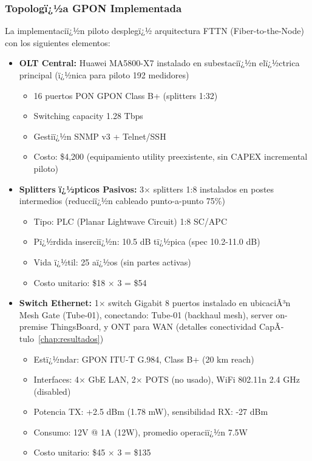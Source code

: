 \subsubsection{Topologï¿½a GPON Implementada}

La implementaciï¿½n piloto desplegï¿½ arquitectura FTTN (Fiber-to-the-Node) con los siguientes elementos:

\begin{itemize}
    \item \textbf{OLT Central:} Huawei MA5800-X7 instalado en subestaciï¿½n elï¿½ctrica principal (ï¿½nica para piloto 192 medidores)
    \begin{itemize}
        \item 16 puertos PON GPON Class B+ (splitters 1:32)
        \item Switching capacity 1.28 Tbps
        \item Gestiï¿½n SNMP v3 + Telnet/SSH
        \item Costo: \$4,200 (equipamiento utility preexistente, sin CAPEX incremental piloto)
    \end{itemize}
    
    \item \textbf{Splitters ï¿½pticos Pasivos:} 3$\times$ splitters 1:8 instalados en postes intermedios (reducciï¿½n cableado punto-a-punto 75\%)
    \begin{itemize}
        \item Tipo: PLC (Planar Lightwave Circuit) 1:8 SC/APC
        \item Pï¿½rdida inserciï¿½n: 10.5 dB tï¿½pica (spec 10.2-11.0 dB)
        \item Vida ï¿½til: 25 aï¿½os (sin partes activas)
        \item Costo unitario: \$18 $\times$ 3 = \$54
    \end{itemize}
    
    \item \textbf{Switch Ethernet:} 1$\times$ switch Gigabit 8 puertos instalado en ubicaciÃ³n Mesh Gate (Tube-01), conectando: Tube-01 (backhaul mesh), server on-premise ThingsBoard, y ONT para WAN (detalles conectividad CapÃ­tulo~\ref{chap:resultados})
    \begin{itemize}
        \item Estï¿½ndar: GPON ITU-T G.984, Class B+ (20 km reach)
        \item Interfaces: 4$\times$ GbE LAN, 2$\times$ POTS (no usado), WiFi 802.11n 2.4 GHz (disabled)
        \item Potencia TX: +2.5 dBm (1.78 mW), sensibilidad RX: -27 dBm
        \item Consumo: 12V @ 1A (12W), promedio operaciï¿½n 7.5W
        \item Costo unitario: \$45 $\times$ 3 = \$135
    \end{itemize}
    

\end{itemize}
